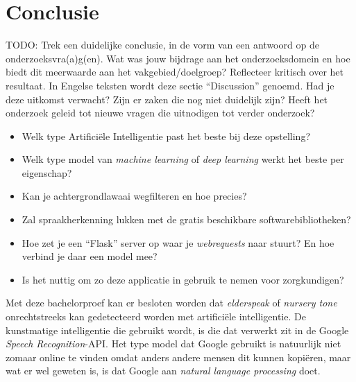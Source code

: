 
\chapter{Conclusie}
\label{ch:conclusie}



\color{blue}
TODO: Trek een duidelijke conclusie, in de vorm van een antwoord op de
 onderzoeksvra(a)g(en). Wat was jouw bijdrage aan het onderzoeksdomein en
 hoe biedt dit meerwaarde aan het vakgebied/doelgroep?
 Reflecteer kritisch over het resultaat. In Engelse teksten wordt deze sectie
 ``Discussion'' genoemd. Had je deze uitkomst verwacht? Zijn er zaken die nog
 niet duidelijk zijn?
 Heeft het onderzoek geleid tot nieuwe vragen die uitnodigen tot verder
onderzoek?


\begin{itemize}
    \item Welk type Artificiële Intelligentie past het beste bij deze opstelling?
    \item Welk type model van \textit{machine learning} of \textit{deep learning} werkt het beste per eigenschap?
    \item Kan je achtergrondlawaai wegfilteren en hoe precies?
    \item Zal spraakherkenning lukken met de gratis beschikbare softwarebibliotheken?
    \item Hoe zet je een ``Flask'' server op waar je \textit{webrequests} naar stuurt? En hoe verbind je daar een model mee?
    \item Is het nuttig om zo deze applicatie in gebruik te nemen voor zorgkundigen?
\end{itemize}

\color{black}

Met deze bachelorproef kan er besloten worden dat \textit{elderspeak} of \textit{nursery tone} onrechtstreeks kan gedetecteerd worden met artificiële intelligentie. De kunstmatige intelligentie die gebruikt wordt, is die dat verwerkt zit in de Google \textit{Speech Recognition}-API.
Het type model dat Google gebruikt is natuurlijk niet zomaar online te vinden omdat anders andere mensen dit kunnen kopiëren, maar wat er wel geweten is, is dat Google aan \textit{natural language processing} doet.

